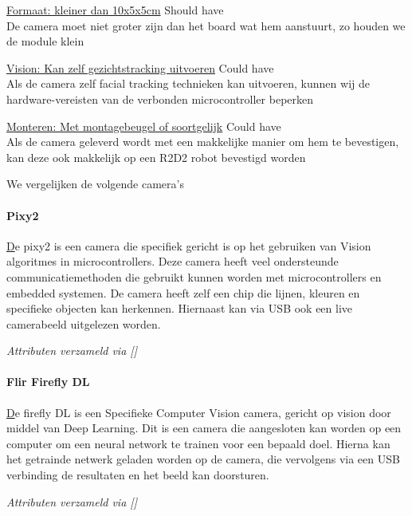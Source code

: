 \documentclass[11pt]{article}
\begin{document}
    \noindent \underline{Formaat: kleiner dan 10x5x5cm} \hfill Should have\\
    De camera moet niet groter zijn dan het board wat hem aanstuurt, zo houden we de module klein

    \noindent \underline{Vision: Kan zelf gezichtstracking uitvoeren} \hfill Could have\\
    Als de camera zelf facial tracking technieken kan uitvoeren, kunnen wij de hardware-vereisten van de verbonden microcontroller beperken

    \noindent \underline{Monteren: Met montagebeugel of soortgelijk} \hfill Could have\\
    Als de camera geleverd wordt met een makkelijke manier om hem te bevestigen, kan deze ook makkelijk op een R2D2 robot bevestigd worden


    \vspace{1em}

    We vergelijken de volgende camera's

    \paragraph{Pixy2}
    \href{https://pixycam.com/pixy2/}
    De pixy2 is een camera die specifiek gericht is op het gebruiken van Vision algoritmes in microcontrollers.
    Deze camera heeft veel ondersteunde communicatiemethoden die gebruikt kunnen worden met microcontrollers en embedded systemen.
    De camera heeft zelf een chip die lijnen, kleuren en specifieke objecten kan herkennen. 
    Hiernaast kan via USB ook een live camerabeeld uitgelezen worden.

    
    \emph{Attributen verzameld via []}

    \paragraph{Flir Firefly DL}
    \href{https://www.flir.com/products/firefly-dl/}
    De firefly DL is een Specifieke Computer Vision camera, gericht op vision door middel van Deep Learning.
    Dit is een camera die aangesloten kan worden op een computer om een neural network te trainen voor een bepaald doel.
    Hierna kan het getrainde netwerk geladen worden op de camera, die vervolgens via een USB verbinding de resultaten en het beeld kan doorsturen.


    \emph{Attributen verzameld via []}
    
\end{document}
